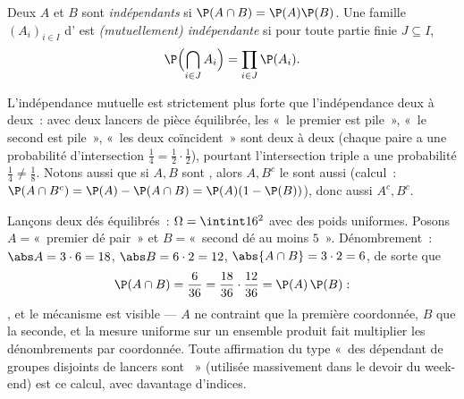\begin{definition}[Indépendance]\label{def:b2:proba:independence}
Deux  $A$ et $B$ sont \emph{indépendants} si $\P(A \cap B) =
\P(A)\P(B)$. Une famille $(A_i)_{i \in I}$ d' est
\emph{(mutuellement) indépendante} si pour toute partie finie $J
\subseteq I$,
\[
\P\Bigl(\bigcap_{i \in J} A_i\Bigr)
= \prod_{i \in J} \P(A_i) .
\]
\end{definition}

\begin{remark}
L'indépendance mutuelle est strictement plus forte que l'indépendance deux à
deux~: avec deux lancers de pièce équilibrée, les  «~le premier est
pile~», «~le second est pile~», «~les deux coïncident~» sont deux à deux
 (chaque paire a une probabilité d'intersection $\frac14 =
\frac12\cdot\frac12$), pourtant l'intersection triple a une probabilité
$\frac14 \neq \frac18$. Notons aussi que si $A, B$ sont ,
alors $A, B^c$ le sont aussi (calcul~: $\P(A \cap B^c) = \P(A) - \P(A\cap B) =
\P(A)(1 - \P(B))$), donc aussi $A^c, B^c$.
\end{remark}

\begin{example}\label{ex:b2:proba:productindep}
Lançons deux dés équilibrés~: $\Omega = \intint16^2$ avec des poids
uniformes. Posons $A = {}$«~premier dé pair~» et $B = {}$«~second
dé au moins $5$~». Dénombrement~: $\abs A = 3\cdot6 = 18$,
$\abs B = 6\cdot2 = 12$, $\abs{A\cap B} = 3\cdot2 = 6$, de sorte que
\[
\P(A\cap B) = \frac6{36} = \frac{18}{36}\cdot\frac{12}{36} =
\P(A)\,\P(B) :
\]
, et le mécanisme est visible --- $A$ ne contraint
que la première coordonnée, $B$ que la seconde, et la mesure
uniforme sur un ensemble produit fait multiplier les dénombrements par
coordonnée. Toute affirmation du type «~des  dépendant de
groupes disjoints de lancers sont ~» (utilisée massivement
dans le devoir du week-end) est ce calcul, avec davantage
d'indices.
\end{example}

